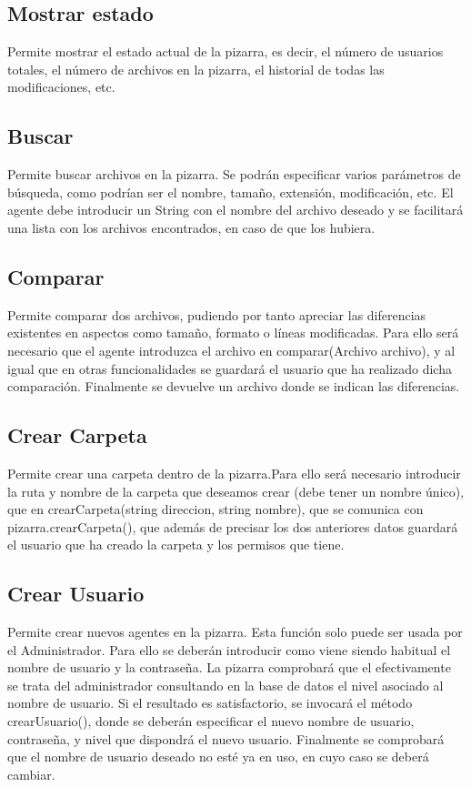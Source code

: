 \subsection{Mostrar estado}
Permite mostrar el estado actual de la pizarra, es decir, el número de usuarios totales, el número de archivos en la pizarra, el historial de todas las modificaciones, etc.

\subsection{Buscar}
Permite buscar archivos en la pizarra. Se podrán especificar varios parámetros de búsqueda, como podrían ser el nombre, tamaño, extensión, modificación, etc. El agente debe introducir un String con el nombre del archivo deseado y se facilitará una lista con los archivos encontrados, en caso de que los hubiera.
\subsection{Comparar}
Permite comparar dos archivos, pudiendo por tanto apreciar las diferencias existentes en aspectos como tamaño, formato o líneas modificadas. Para ello será necesario que el agente introduzca el archivo en comparar(Archivo archivo), y al igual que en otras funcionalidades se guardará el usuario que ha realizado dicha comparación. Finalmente se devuelve un archivo donde se indican las diferencias.

\subsection{Crear Carpeta}
Permite crear una carpeta dentro de la pizarra.Para ello será necesario introducir la ruta y nombre de la carpeta que deseamos crear (debe tener un nombre único), que en crearCarpeta(string direccion, string nombre), que se comunica con pizarra.crearCarpeta(), que además de precisar los dos anteriores datos guardará el usuario que ha creado la carpeta y los permisos que tiene.

\subsection{Crear Usuario}
Permite crear nuevos agentes en la pizarra. Esta función solo puede ser usada por el Administrador. Para ello se deberán introducir como viene siendo habitual el nombre de usuario y la contraseña. La pizarra comprobará que el efectivamente se trata del administrador consultando en la base de datos el nivel asociado al nombre de usuario. Si el resultado es satisfactorio, se invocará el método crearUsuario(), donde se deberán especificar el nuevo nombre de usuario, contraseña, y nivel que dispondrá el nuevo usuario. Finalmente se comprobará que el nombre de usuario deseado no esté ya en uso, en cuyo caso se deberá cambiar.
